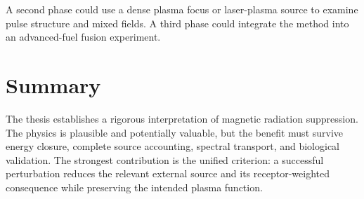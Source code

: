 A second phase could use a dense plasma focus or laser-plasma source to examine pulse structure and mixed fields. A third phase could integrate the method into an advanced-fuel fusion experiment.

\section{Summary}

The thesis establishes a rigorous interpretation of magnetic radiation suppression. The physics is plausible and potentially valuable, but the benefit must survive energy closure, complete source accounting, spectral transport, and biological validation. The strongest contribution is the unified criterion: a successful perturbation reduces the relevant external source and its receptor-weighted consequence while preserving the intended plasma function.
